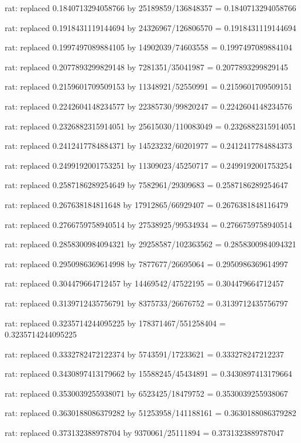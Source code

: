 \documentclass[a4paper,10pt]{article}
\begin{document}
\begin{eulernotebook}
\begin{eulercomment}
\begin{eulercomment}
\begin{eulercomment}
\begin{eulercomment}
\begin{eulercomment}
\begin{eulercomment}
\begin{eulercomment}
\begin{eulercomment}
\begin{eulercomment}
\begin{eulercomment}
\begin{eulercomment}
\begin{eulercomment}
\begin{eulercomment}
\begin{eulercomment}
\begin{eulercomment}
\begin{eulercomment}
\begin{euleroutput}
  rat: replaced 0.1840713294058766 by 25189859/136848357 = 0.1840713294058766
  
  rat: replaced 0.1918431119144694 by 24326967/126806570 = 0.1918431119144694
  
  rat: replaced 0.1997497089884105 by 14902039/74603558 = 0.1997497089884104
  
  rat: replaced 0.2077893299829148 by 7281351/35041987 = 0.2077893299829145
  
  rat: replaced 0.2159601709509153 by 11348921/52550991 = 0.2159601709509151
  
  rat: replaced 0.2242604148234577 by 22385730/99820247 = 0.2242604148234576
  
  rat: replaced 0.2326882315914051 by 25615030/110083049 = 0.2326882315914051
  
  rat: replaced 0.2412417784884371 by 14523232/60201977 = 0.2412417784884373
  
  rat: replaced 0.2499192001753251 by 11309023/45250717 = 0.2499192001753254
  
  rat: replaced 0.2587186289254649 by 7582961/29309683 = 0.2587186289254647
  
  rat: replaced 0.267638184811648 by 17912865/66929407 = 0.2676381848116479
  
  rat: replaced 0.2766759758940514 by 27538925/99534934 = 0.2766759758940514
  
  rat: replaced 0.2858300984094321 by 29258587/102363562 = 0.2858300984094321
  
  rat: replaced 0.2950986369614998 by 7877677/26695064 = 0.2950986369614997
  
  rat: replaced 0.304479664712457 by 14469542/47522195 = 0.304479664712457
  
  rat: replaced 0.3139712435756791 by 8375733/26676752 = 0.3139712435756797
  
  rat: replaced 0.3235714244095225 by 178371467/551258404 = 0.3235714244095225
  
  rat: replaced 0.3332782472122374 by 5743591/17233621 = 0.333278247212237
  
  rat: replaced 0.3430897413179662 by 15588245/45434891 = 0.3430897413179664
  
  rat: replaced 0.3530039255938071 by 6523425/18479752 = 0.3530039255938067
  
  rat: replaced 0.3630188086379282 by 51253958/141188161 = 0.3630188086379282
  
  rat: replaced 0.373132388978704 by 9370061/25111894 = 0.3731323889787047
  

\end{euleroutput}
\end{eulercomment}
\end{eulercomment}
\end{eulercomment}
\end{eulercomment}
\end{eulercomment}
\end{eulercomment}
\end{eulercomment}
\end{eulercomment}
\end{eulercomment}
\end{eulercomment}
\end{eulercomment}
\end{eulercomment}
\end{eulercomment}
\end{eulercomment}
\end{eulercomment}
\end{eulercomment}
\end{eulernotebook}
\end{document}
